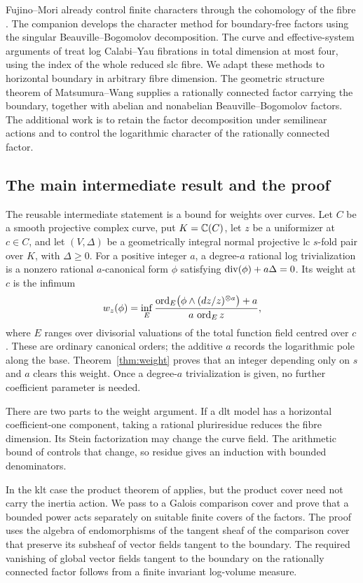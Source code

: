 Fujino--Mori already control finite characters through the cohomology
of the fibre \cite[Theorem~3.1 and Sections~3.6--3.8]{FujinoMori}.
The companion \cite{U} develops the character method for
boundary-free factors using the singular Beauville--Bogomolov
decomposition. The curve and effective-system arguments of \cite{U4}
treat log Calabi--Yau fibrations in total dimension at most four,
using the index of the whole reduced slc fibre.
We adapt these methods to horizontal boundary in arbitrary fibre
dimension. The geometric structure theorem of Matsumura--Wang
\cite[Theorem~1.3]{MW} supplies a rationally connected factor carrying
the boundary, together with abelian and nonabelian
Beauville--Bogomolov factors. The additional work is to retain the
factor decomposition under semilinear actions and to control the
logarithmic character of the rationally connected factor.

\subsection{The main intermediate result and the proof}

The reusable intermediate statement is a bound for weights over
curves. Let $C$ be a smooth projective complex curve, put $K=\mathbb C(C)$,
let $z$ be a uniformizer at $c\in C$, and
let $(V,\Delta)$ be a geometrically integral normal projective lc
$s$-fold pair over $K$, with $\Delta\geq0$. For a positive integer $a$,
a degree-$a$ rational
log trivialization is a nonzero rational $a$-canonical form $\phi$
satisfying $\operatorname{div}(\phi)+a\Delta=0$.
Its weight at $c$ is the infimum
\[
 w_z(\phi)=\inf_E
 \frac{\operatorname{ord}_E\bigl(\phi\wedge(dz/z)^{\otimes a}\bigr)+a}
      {a\,\operatorname{ord}_E z},
\]
where $E$ ranges over divisorial valuations of the total function
field centred over $c$. These are ordinary canonical orders;
the additive $a$ records the logarithmic pole along the base.
Theorem~\ref{thm:weight} proves that an integer depending only on
$s$ and $a$ clears this weight. Once a degree-$a$ trivialization is
given, no further coefficient parameter is needed.

There are two parts to the weight argument. If a dlt model has a
horizontal coefficient-one component, taking a rational pluriresidue
reduces the fibre dimension. Its Stein factorization may change the
curve field. The arithmetic bound of \cite{SD} controls that change,
so residue gives an induction with bounded denominators.

In the klt case the product theorem of \cite{MW} applies, but the
product cover need not carry the inertia action. We pass to a Galois
comparison cover and prove that a bounded power acts separately on
suitable finite covers of the factors. The proof uses the algebra of
endomorphisms of the tangent sheaf of the comparison cover that preserve
its subsheaf of vector fields tangent to the boundary. The required
vanishing of global vector fields tangent to the boundary on the
rationally connected factor follows from a finite invariant log-volume
measure.

